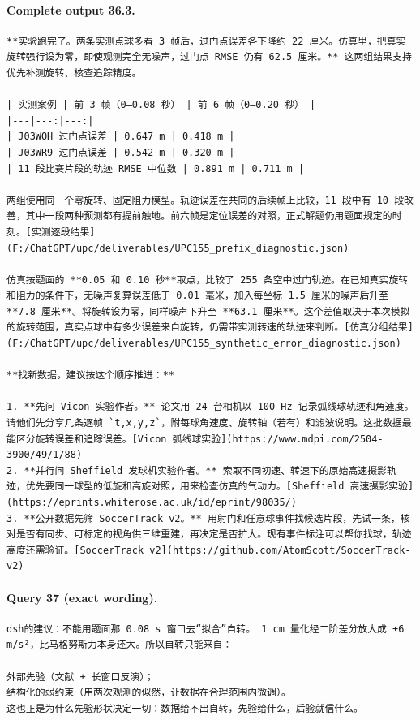 \documentclass[UTF8,10pt]{ctexart}
\begin{document}
\paragraph{Complete output 36.3.}
\begin{Verbatim}[breaklines=true,breakanywhere=true,fontsize=\scriptsize,frame=single,framesep=2pt]
**实验跑完了。两条实测点球多看 3 帧后，过门点误差各下降约 22 厘米。仿真里，把真实旋转强行设为零，即使观测完全无噪声，过门点 RMSE 仍有 62.5 厘米。** 这两组结果支持优先补测旋转、核查追踪精度。

| 实测案例 | 前 3 帧（0–0.08 秒） | 前 6 帧（0–0.20 秒） |
|---|---:|---:|
| J03WOH 过门点误差 | 0.647 m | 0.418 m |
| J03WR9 过门点误差 | 0.542 m | 0.320 m |
| 11 段比赛片段的轨迹 RMSE 中位数 | 0.891 m | 0.711 m |

两组使用同一个零旋转、固定阻力模型。轨迹误差在共同的后续帧上比较，11 段中有 10 段改善，其中一段两种预测都有提前触地。前六帧是定位误差的对照，正式解题仍用题面规定的时刻。[实测逐段结果](F:/ChatGPT/upc/deliverables/UPC155_prefix_diagnostic.json)

仿真按题面的 **0.05 和 0.10 秒**取点，比较了 255 条空中过门轨迹。在已知真实旋转和阻力的条件下，无噪声复算误差低于 0.01 毫米，加入每坐标 1.5 厘米的噪声后升至 **7.8 厘米**。将旋转设为零，同样噪声下升至 **63.1 厘米**。这个差值取决于本次模拟的旋转范围，真实点球中有多少误差来自旋转，仍需带实测转速的轨迹来判断。[仿真分组结果](F:/ChatGPT/upc/deliverables/UPC155_synthetic_error_diagnostic.json)

**找新数据，建议按这个顺序推进：**

1. **先问 Vicon 实验作者。** 论文用 24 台相机以 100 Hz 记录弧线球轨迹和角速度。请他们先分享几条逐帧 `t,x,y,z`，附每球角速度、旋转轴（若有）和滤波说明。这批数据最能区分旋转误差和追踪误差。[Vicon 弧线球实验](https://www.mdpi.com/2504-3900/49/1/88)
2. **并行问 Sheffield 发球机实验作者。** 索取不同初速、转速下的原始高速摄影轨迹，优先要同一球型的低旋和高旋对照，用来检查仿真的气动力。[Sheffield 高速摄影实验](https://eprints.whiterose.ac.uk/id/eprint/98035/)
3. **公开数据先筛 SoccerTrack v2。** 用射门和任意球事件找候选片段，先试一条，核对是否有同步、可标定的视角供三维重建，再决定是否扩大。现有事件标注可以帮你找球，轨迹高度还需验证。[SoccerTrack v2](https://github.com/AtomScott/SoccerTrack-v2)
\end{Verbatim}

\paragraph{Query 37 (exact wording).}
\begin{Verbatim}[breaklines=true,breakanywhere=true,fontsize=\scriptsize,frame=single,framesep=2pt]
dsh的建议：不能用题面那 0.08 s 窗口去“拟合”自转。 1 cm 量化经二阶差分放大成 ±6 m/s²，比马格努斯力本身还大。所以自转只能来自：

外部先验（文献 + 长窗口反演）；
结构化的弱约束（用两次观测的似然，让数据在合理范围内微调）。
这也正是为什么先验形状决定一切：数据给不出自转，先验给什么，后验就信什么。
\end{Verbatim}
\end{document}
